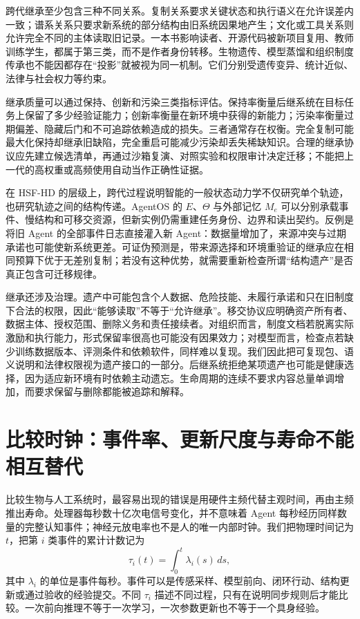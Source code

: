 跨代继承至少包含三种不同关系。复制关系要求关键状态和执行语义在允许误差内一致；谱系关系只要求新系统的部分结构由旧系统因果地产生；文化或工具关系则允许完全不同的主体读取旧记录。一本书影响读者、开源代码被新项目复用、教师训练学生，都属于第三类，而不是作者身份转移。生物遗传、模型蒸馏和组织制度传承也不能因都存在“投影”就被视为同一机制。它们分别受遗传变异、统计近似、法律与社会权力等约束。

继承质量可以通过保持、创新和污染三类指标评估。保持率衡量后继系统在目标任务上保留了多少经验证能力；创新率衡量在新环境中获得的新能力；污染率衡量过期偏差、隐藏后门和不可追踪依赖造成的损失。三者通常存在权衡。完全复制可能最大化保持却继承旧缺陷，完全重启可能减少污染却丢失稀缺知识。合理的继承协议应先建立候选清单，再通过沙箱复演、对照实验和权限审计决定迁移；不能把上一代的高权重或高频使用自动当作正确性证据。

在 HSF-HD 的层级上，跨代过程说明智能的一般状态动力学不仅研究单个轨迹，也研究轨迹之间的结构传递。AgentOS 的 $E$、$\Theta$ 与外部记忆 $M_e$ 可以分别承载事件、慢结构和可移交资源，但新实例仍需重建任务身份、边界和读出契约。反例是将旧 Agent 的全部事件日志直接灌入新 Agent：数据量增加了，来源冲突与过期承诺也可能使新系统更差。可证伪预测是，带来源选择和环境重验证的继承应在相同预算下优于无差别复制；若没有这种优势，就需要重新检查所谓“结构遗产”是否真正包含可迁移规律。

继承还涉及治理。遗产中可能包含个人数据、危险技能、未履行承诺和只在旧制度下合法的权限，因此“能够读取”不等于“允许继承”。移交协议应明确资产所有者、数据主体、授权范围、删除义务和责任接续者。对组织而言，制度文档若脱离实际激励和执行能力，形式保留率很高也可能没有因果效力；对模型而言，检查点若缺少训练数据版本、评测条件和依赖软件，同样难以复现。我们因此把可复现包、语义说明和法律权限视为遗产接口的一部分。后继系统拒绝某项遗产也可能是健康选择，因为适应新环境有时依赖主动遗忘。生命周期的连续不要求内容总量单调增加，而要求保留与删除都能被追踪和解释。

\section{比较时钟：事件率、更新尺度与寿命不能相互替代}
\label{sec:comparative_chronology}

比较生物与人工系统时，最容易出现的错误是用硬件主频代替主观时间，再由主频推出寿命。处理器每秒数十亿次电信号变化，并不意味着 Agent 每秒经历同样数量的完整认知事件；神经元放电率也不是人的唯一内部时钟。我们把物理时间记为 $t$，把第 $i$ 类事件的累计计数记为
\begin{equation}
    \tau_i(t)=\int_0^t \lambda_i(s)\,ds,
\end{equation}
其中 $\lambda_i$ 的单位是事件每秒。事件可以是传感采样、模型前向、闭环行动、结构更新或通过验收的经验提交。不同 $\tau_i$ 描述不同过程，只有在说明同步规则后才能比较。一次前向推理不等于一次学习，一次参数更新也不等于一个具身经验。

